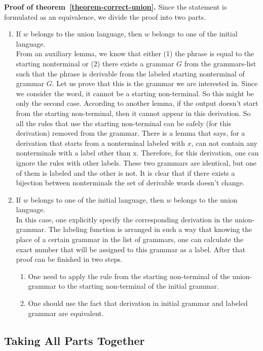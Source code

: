 \textbf{Proof of theorem~\ref{theorem-correct-union}.} Since the statement is formulated as an equivalence, we divide the proof into two parts.
\begin{enumerate}
\item If $w$ belongs to the union language, then $w$ belongs to one of the initial language. \\
From an auxiliary lemma, we know that either (1) the phrase is equal to the starting nonterminal or (2) there exists a grammar $G$ from the grammars-list such that the phrase is derivable from the labeled starting nonterminal of grammar $G$.
Let us prove that this is the grammar we are interested in.
Since we consider the word, it cannot be a starting non-terminal. So this might be only the second case.
According to another lemma, if the output doesn't start from the starting non-terminal, then it cannot appear in this derivation. So all the rules that use the starting non-terminal can be safely (for this derivation) removed from the grammar.
There is a lemma that says, for a derivation that starts from a nonterminal labeled with $x$, can not contain any nonterminals with a label other than x. Therefore, for this derivation, one can ignore the rules with other labels.
These two grammars are identical, but one of them is labeled and the other is not. It is clear that if there exists a bijection between nonterminals the set of derivable words doesn't change.

\item If $w$ belongs to one of the initial language, then $w$ belongs to the union language. \\
In this case, one explicitly specify the corresponding derivation in the union-grammar.
The labeling function is arranged in such a way that knowing the place of a certain grammar in the list of grammars, one can calculate the exact number that will be assigned to this grammar as a label.
After that proof can be finished in two steps. 
\begin{enumerate}
\item One need to apply the rule from the starting non-terminal of the union-grammar to the starting non-terminal of the initial grammar. 
\item One should use the fact that derivation in initial grammar and labeled grammar are equivalent.
\end{enumerate}
\end{enumerate}

\subsection{Taking All Parts Together}

